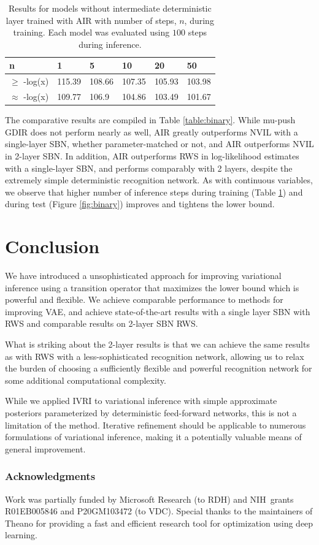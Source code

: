\documentclass{article} %
\begin{document}
\begin{table}
\begin{tabular}{ | m{1.4cm} | m{1cm} | m{1cm} | m{1cm} | m{1cm} | m{1cm} |}
\hline
n & 1 & 5 & 10 & 20 & 50 \\
\hline
$\ge$ -log(x) & 115.39 & 108.66 & 107.35 & 105.93 & 103.98 \\
\hline
$\approx$ -log(x) & 109.77 & 106.9 & 104.86 & 103.49 & 101.67 \\
\hline
\end{tabular}
\caption{Results for models without intermediate deterministic layer trained with AIR with number of steps, $n$, during training. Each model was evaluated using $100$ steps during inference.}
\label{table:binary_step}
\end{table}

The comparative results are compiled in Table \ref{table:binary}. While mu-push GDIR does not perform nearly as well, AIR greatly outperforms NVIL with a single-layer SBN, whether parameter-matched or not, and AIR outperforms NVIL in 2-layer SBN. In addition, AIR outperforms RWS in log-likelihood estimates with a single-layer SBN, and performs comparably with 2 layers, despite the extremely simple deterministic recognition network. As with continuous variables, we observe that higher number of inference steps during training (Table \ref{table:binary_step}) and during test (Figure \ref{fig:binary}) improves and tightens the lower bound.

\section{Conclusion}
We have introduced a unsophisticated approach for improving variational inference using a transition operator that maximizes the lower bound which is powerful and flexible. We achieve comparable performance to methods for improving VAE, and achieve state-of-the-art results with a single layer SBN with RWS and comparable results on 2-layer SBN RWS.

What is striking about the 2-layer results is that we can achieve the same results as with RWS with a less-sophisticated recognition network, allowing us to relax the burden of choosing a sufficiently flexible and powerful recognition network for some additional computational complexity.

While we applied IVRI to variational inference with simple approximate posteriors parameterized by deterministic feed-forward networks, this is not a limitation of the method. Iterative refinement should be applicable to numerous formulations of variational inference, making it a potentially valuable means of general improvement.

\subsubsection*{Acknowledgments}
Work was partially funded by Microsoft Research (to RDH) and NIH\ grants R01EB005846 and P20GM103472 (to VDC). Special thanks to the maintainers of Theano for providing a fast and efficient research tool for optimization using deep learning.



\end{document}
